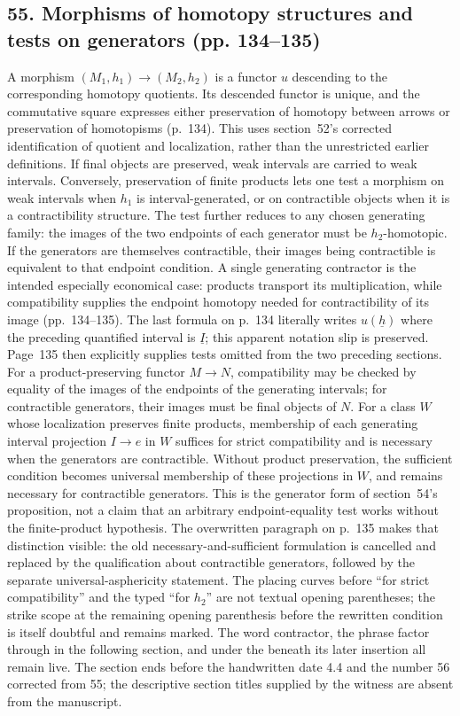 \subsection*{55. Morphisms of homotopy structures and tests on generators (pp. 134--135)}
A morphism $(M_1,h_1)\to(M_2,h_2)$ is a functor $u$ descending to the corresponding homotopy quotients. Its descended functor is unique, and the commutative square expresses either preservation of homotopy between arrows or preservation of homotopisms (p.~134). This uses section~52's corrected identification of quotient and localization, rather than the unrestricted earlier definitions. If final objects are preserved, weak intervals are carried to weak intervals. Conversely, preservation of finite products lets one test a morphism on weak intervals when $h_1$ is interval-generated, or on contractible objects when it is a contractibility structure. The test further reduces to any chosen generating family: the images of the two endpoints of each generator must be $h_2$-homotopic. If the generators are themselves contractible, their images being contractible is equivalent to that endpoint condition. A single generating contractor is the intended especially economical case: products transport its multiplication, while compatibility supplies the endpoint homotopy needed for contractibility of its image (pp.~134--135). The last formula on p.~134 literally writes $u(\underline h)$ where the preceding quantified interval is $\underline I$; this apparent notation slip is preserved. Page~135 then explicitly supplies tests omitted from the two preceding sections. For a product-preserving functor $M\to N$, compatibility may be checked by equality of the images of the endpoints of the generating intervals; for contractible generators, their images must be final objects of $N$. For a class $W$ whose localization preserves finite products, membership of each generating interval projection $I\to e$ in $W$ suffices for strict compatibility and is necessary when the generators are contractible. Without product preservation, the sufficient condition becomes universal membership of these projections in $W$, and remains necessary for contractible generators. This is the generator form of section~54's proposition, not a claim that an arbitrary endpoint-equality test works without the finite-product hypothesis. The overwritten paragraph on p.~135 makes that distinction visible: the old necessary-and-sufficient formulation is cancelled and replaced by the qualification about contractible generators, followed by the separate universal-asphericity statement. The placing curves before ``for strict compatibility'' and the typed ``for $h_2$'' are not textual opening parentheses; the strike scope at the remaining opening parenthesis before the rewritten condition is itself doubtful and remains marked. The word contractor, the phrase factor through in the following section, and under the beneath its later insertion all remain live. The section ends before the handwritten date 4.4 and the number 56 corrected from 55; the descriptive section titles supplied by the witness are absent from the manuscript.
